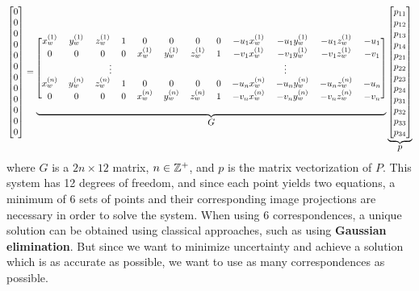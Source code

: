 \setcounter{MaxMatrixCols}{20}
\begin{equation}
    \scalemath{0.9}{
    \begin{bmatrix}
        0 \\ 0 \\ 0 \\ 0 \\ 0 \\ 0 \\ 0 \\ 0 \\ 0 \\ 0 \\ 0 \\ 0
    \end{bmatrix}
    =
    \underbrace{
        \begin{blockarray}{[*{12}c]}
            x_w^{(1)} & y_w^{(1)} & z_w^{(1)} & 1 & 0         & 0         & 0         & 0 & -u_1 x_w^{(1)} & -u_1 y_w^{(1)} & -u_1 z_w^{(1)} & -u_1 \\
            0         & 0         & 0         & 0 & x_w^{(1)} & y_w^{(1)} & z_w^{(1)} & 1 & -v_1 x_w^{(1)} & -v_1 y_w^{(1)} & -v_1 z_w^{(1)} & -v_1 \\
            \BAmulticolumn{6}{c}{\vdots} & \BAmulticolumn{6}{c}{\vdots} \\
            x_w^{(n)} & y_w^{(n)} & z_w^{(n)} & 1 & 0         & 0         & 0         & 0 & -u_n x_w^{(n)} & -u_n y_w^{(n)} & -u_n z_w^{(n)} & -u_n \\
            0         & 0         & 0         & 0 & x_w^{(n)} & y_w^{(n)} & z_w^{(n)} & 1 & -v_n x_w^{(n)} & -v_n y_w^{(n)} & -v_n z_w^{(n)} & -v_n
        \end{blockarray}
    }_{\mathlarger{G}}
    \underbrace{
        \begin{bmatrix}
            p_{11} \\ p_{12} \\ p_{13} \\ p_{14} \\ p_{21} \\ p_{22} \\ p_{23} \\ p_{24} \\ p_{31} \\ p_{32} \\ p_{33} \\ p_{34}
        \end{bmatrix}
    }_{\mathlarger{p}}
    }
\end{equation}
where $G$ is a $2n \times 12$ matrix, $n \in \mathbb{Z}^+$, and $p$ is the matrix vectorization of $P$. This system has 12 degrees of freedom, and since each point yields two equations, a minimum of 6 sets of points and their corresponding image projections are necessary in order to solve the system. When using 6 correspondences, a unique solution can be obtained using classical approaches, such as using 
\textbf{Gaussian elimination}. But since we want to minimize uncertainty and achieve a solution which is as accurate as possible, we want to use as many correspondences as possible. 

